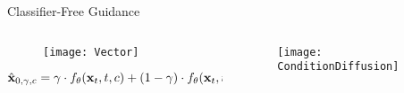 
\begin{frame}{Classifier-Free Guidance}
%	

	

	\begin{columns}
		\begin{column}{0.55\textwidth}
			\begin{figure}
				\centering
				\texttt{[image: Vector]}
			\end{figure}
		
		\begin{equation*}
			\hat{\mathbf{x}}_{0, \gamma, c} = \gamma \cdot f_{\theta} (\mathbf{x}_t, t, c) + (1-\gamma) \cdot f_{\theta} (\mathbf{x}_t, t, c_\varnothing)
		\end{equation*}
		
		\vspace{-15pt}
		
	
			
		\end{column}
		
		\begin{column}{0.45\textwidth}
				\begin{figure}
				\centering
				\texttt{[image: ConditionDiffusion]}
			\end{figure}
		\end{column}
	\end{columns}
	
\end{frame}





